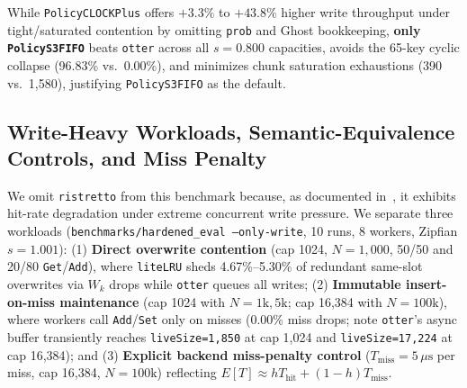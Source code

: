 \documentclass[11pt,a4paper]{article}
\begin{document}
While \texttt{PolicyCLOCKPlus} offers $+3.3\%$ to $+43.8\%$ higher write throughput under tight/saturated contention by omitting \texttt{prob} and Ghost bookkeeping, \textbf{only \texttt{PolicyS3FIFO}} beats \texttt{otter} across all $s=0.800$ capacities, avoids the 65-key cyclic collapse (96.83\% vs.\ 0.00\%), and minimizes chunk saturation exhaustions (390 vs.\ 1,580), justifying \texttt{PolicyS3FIFO} as the default.

\subsection{Write-Heavy Workloads, Semantic-Equivalence Controls, and Miss Penalty}

We omit \texttt{ristretto} from this benchmark because, as documented in~\cite{otter}, it exhibits hit-rate degradation under extreme concurrent write pressure. We separate three workloads (\texttt{benchmarks/hardened\_eval --only-write}, 10 runs, 8 workers, Zipfian $s=1.001$): (1) \textbf{Direct overwrite contention} (cap 1024, $N=1{,}000$, 50/50 and 20/80 \texttt{Get}/\texttt{Add}), where \texttt{liteLRU} sheds 4.67\%--5.30\% of redundant same-slot overwrites via $W_k$ drops while \texttt{otter} queues all writes; (2) \textbf{Immutable insert-on-miss maintenance} (cap 1024 with $N=1\text{k}, 5\text{k}$; cap 16,384 with $N=100\text{k}$), where workers call \texttt{Add}/\texttt{Set} only on misses (0.00\% miss drops; note \texttt{otter}'s async buffer transiently reaches \texttt{liveSize=1,850} at cap 1,024 and \texttt{liveSize=17,224} at cap 16,384); and (3) \textbf{Explicit backend miss-penalty control} ($T_{\mathrm{miss}} = 5\,\mu\text{s}$ per miss, cap 16,384, $N=100\text{k}$) reflecting $E[T] \approx h T_{\mathrm{hit}} + (1 - h) T_{\mathrm{miss}}$.
\end{document}
